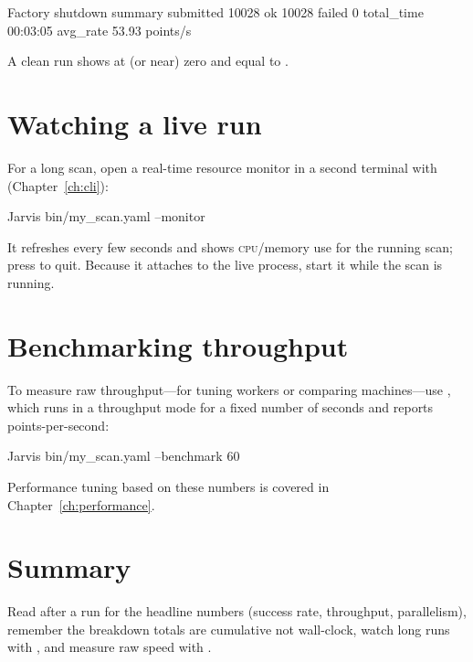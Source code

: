 \begin{plaincode}
Factory shutdown summary
  submitted   10028
  ok          10028
  failed          0
  total_time  00:03:05
  avg_rate    53.93 points/s
\end{plaincode}

\noindent A clean run shows  at (or near) zero and  equal to
.

\section{Watching a live run}
\label{sec:rs-monitor}

For a long scan, open a real-time resource monitor in a second terminal with 
(Chapter~\ref{ch:cli}):

\begin{shellbox}
Jarvis bin/my_scan.yaml --monitor
\end{shellbox}

\noindent It refreshes every few seconds and shows \textsc{cpu}/memory use for the running scan;
press  to quit. Because it attaches to the live process, start it while the scan is
running.

\section{Benchmarking throughput}
\label{sec:rs-benchmark}

To measure raw throughput---for tuning workers or comparing machines---use ,
which runs in a throughput mode for a fixed number of seconds and reports points-per-second:

\begin{shellbox}
Jarvis bin/my_scan.yaml --benchmark 60
\end{shellbox}

\noindent Performance tuning based on these numbers is covered in Chapter~\ref{ch:performance}.

\section{Summary}
\label{sec:rs-summary}

Read  after a run for the headline numbers (success rate, throughput,
parallelism), remember the breakdown totals are cumulative not wall-clock, watch long runs with
, and measure raw speed with .
